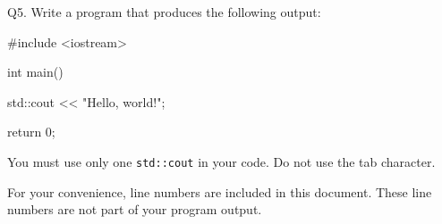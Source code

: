 Q5. Write a program that produces the following output:
\begin{console}[numbers=left]
#include <iostream>

int main()
{
    std::cout << "Hello, world!\n";

    return 0;
}

\end{console}
You must use only one 
\verb!std::cout! in your code. Do not use the tab character. 

For your convenience, line numbers are included in this document.
These line numbers are not part of your program output.

